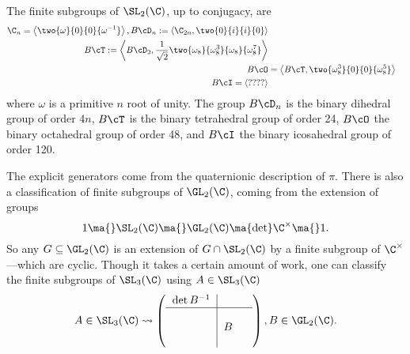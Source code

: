 \begin{thm}
The finite subgroups of $\SL_2(\C)$, up to conjugacy, are
	\[
	\begin{split}
	\C_n=\left\langle \two{\omega}{0}{0}{\omega^{-1}} \right\rangle,
	B\cD_n:= \left\langle \C_{2n}, \two{0}{i}{i}{0} \right\rangle \\
	B\cT:= \left\langle B\cD_2, \dfrac{1}{\sqrt{2}} \two{\omega_8}{\omega_8^3}{\omega_8}{\omega_8^7} \right\rangle \\
	B\cO&= \left\langle B\cT, \two{\omega_8^3}{0}{0}{\omega_8^5} \right\rangle \\
	B\cI= \left\langle ????\right\rangle
	\end{split}
	\]
where $\omega$ is a primitive $n$ root of unity. The group $B\cD_n$ is the binary dihedral group of order $4n$, $B\cT$ is the binary tetrahedral group of order 24, $B\cO$ the binary octahedral group of order 48, and $B\cI$ the binary icosahedral group of order 120. 
\end{thm}


The explicit generators come from the quaternionic description of $\pi$. There is also a classification of finite subgroups of $\GL_2(\C)$, coming from the extension of groups
	\[
	1 \ma{} \SL_2(\C) \ma{} \GL_2(\C) \ma{\det} \C^\times \ma{} 1.
	\]
So any $G \subseteq \GL_2(\C)$ is an extension of $G \cap \SL_2(\C)$ by a finite subgroup of $\C^\times$---which are cyclic. Though it takes a certain amount of work, one can classify the finite subgroups of $\SL_3(\C)$ using $A \in \SL_3(\C)$
	\[
	A \in \SL_3(\C) \rightsquigarrow \left( \begin{tabular}{c|ccc} $\det B^{-1}$ & & \\ \hline & & \\ & $B$ & \\ & & \end{tabular} \right), B \in \GL_2(\C).
	\]


























